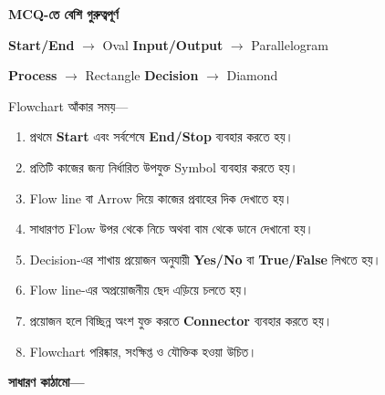 \begin{rememberbox}

\textbf{\color{deepOrange}MCQ-তে বেশি গুরুত্বপূর্ণ}

\textbf{Start/End}
\(\rightarrow\)
Oval
\qquad
\textbf{Input/Output}
\(\rightarrow\)
Parallelogram

\textbf{Process}
\(\rightarrow\)
Rectangle
\qquad
\textbf{Decision}
\(\rightarrow\)
Diamond

\end{rememberbox}



Flowchart আঁকার সময়—

\begin{enumerate}

\item
প্রথমে \textbf{Start} এবং সর্বশেষে
\textbf{End/Stop} ব্যবহার করতে হয়।

\item
প্রতিটি কাজের জন্য নির্ধারিত উপযুক্ত Symbol ব্যবহার করতে হয়।

\item
Flow line বা Arrow দিয়ে কাজের প্রবাহের দিক দেখাতে হয়।

\item
সাধারণত Flow উপর থেকে নিচে অথবা বাম থেকে ডানে দেখানো হয়।

\item
Decision-এর শাখায় প্রয়োজন অনুযায়ী
\textbf{Yes/No} বা \textbf{True/False} লিখতে হয়।

\item
Flow line-এর অপ্রয়োজনীয় ছেদ এড়িয়ে চলতে হয়।

\item
প্রয়োজন হলে বিচ্ছিন্ন অংশ যুক্ত করতে
\textbf{Connector} ব্যবহার করতে হয়।

\item
Flowchart পরিষ্কার, সংক্ষিপ্ত ও যৌক্তিক হওয়া উচিত।

\end{enumerate}


\textbf{সাধারণ কাঠামো—}

